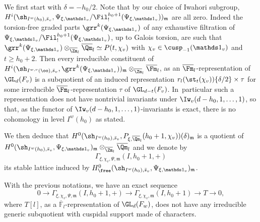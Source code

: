 \begin{enumeratea}
\item
We first start with $\delta=-h_0/2$. Note that by our choice of Iwahori
subgroup,
$H^i(\sh_{I^w(h_0),\bar s_v},\Psi_{\xi,\mathds 1_v}/\Fil^{h_0+1}_!
(\Psi_{\xi,\mathds 1_v}))_{\mathfrak m}$
are all zero. Indeed the torsion-free graded parts $\grr^k(\Psi_{\xi,\mathds 1_v})$
of any exhaustive filtration of
$\Psi_{\xi,\mathds 1_v} / \Fil^{h_0+1}_!(\Psi_{\xi,\mathds 1_v})$, up to Galois torsion, are such that
$\grr^k(\Psi_{\xi,\mathds 1_v}) \otimes_{\overline \Zm_l} \overline \Qm_l \simeq P(t,\chi_v)$
with $\chi_v \in \cusp_{-1}(\mathds 1_v)$ and $t \geq h_0+2$. Then
every irreducible constituent of
$H^i(\sh_{I^{w,v}(\oo),\bar s_v},\grr^k(\Psi_{\xi,\mathds 1_v}))_{\mathfrak m}
\otimes_{\overline \Zm_l} \overline \Fm_l$,
as an $\overline \Fm_l$-representation of $\GL_d(F_v)$ is a subquotient of an induced
representation
$r_l(\st_t(\chi_v))\{\delta/2\} \times \tau$ for some irreducible $\overline \Fm_l$-representation
$\tau$ of $\GL_{d-t}(F_v)$. In~particular such a representation does not have nontrivial invariants under \hbox{$\Iw_v(d-h_0,1,\dots,1)$}, so that, as the functor of
$\Iw_v(d-h_0,1,\dots,1)$-invariants is exact,
there is no cohomology in level $I^w(h_0)$ as stated.

We then deduce that
$H^0(\sh_{I^w(h_0),\bar s_v},P_{\xi,\overline \Qm_l}(h_0+1,\chi_v))(\delta)_{\mathfrak m}$
is a quotient of
$H^0(\sh_{I^w(h_0),\bar s_v},\Psi_{\xi,\mathds 1_v})_{\mathfrak m}
\otimes_{\overline \Zm_l} \overline \Qm_l$
and we denote by
\[
\Gamma_{\xi,\chi_v,\Psi,\mathfrak m}(I,h_0+1,+)
\]
its stable lattice induced by
$H^0_{\free}(\sh_{I^w(h_0),\bar s_v},\Psi_{\xi,\mathds 1_v})_{\mathfrak m}$.

\begin{prop} \label{prop-lattice-psi}
With the previous notations, we have an exact sequence
\[
0 \to \Gamma_{\xi,\chi_v,\Psi,\mathfrak m}(I,h_0+1,+)
\to \Gamma_{\xi,\chi_v,\mathfrak m}(I,h_0+1) \to T
\to 0,
\]
where $T[l]$, as a $\overline{\mathbb F}_l$-representation of $\GL_d(F_w)$,
does not have any irreducible generic subquotient with cuspidal support
made of characters.
\end{prop}


\end{enumeratea}
